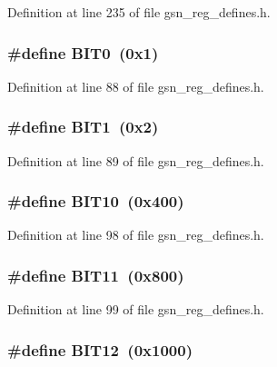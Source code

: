Definition at line 235 of file gsn\_\-reg\_\-defines.h.

\hypertarget{a00546_ad4d43f8748b542bce39e18790f845ecc}{
\subsubsection[{BIT0}]{\setlength{\rightskip}{0pt plus 5cm}\#define BIT0~(0x1)}}
\label{a00546_ad4d43f8748b542bce39e18790f845ecc}


Definition at line 88 of file gsn\_\-reg\_\-defines.h.

\hypertarget{a00546_a601923eba46784638244c1ebf2622a2a}{
\subsubsection[{BIT1}]{\setlength{\rightskip}{0pt plus 5cm}\#define BIT1~(0x2)}}
\label{a00546_a601923eba46784638244c1ebf2622a2a}


Definition at line 89 of file gsn\_\-reg\_\-defines.h.

\hypertarget{a00546_a8c0f01fdf020d0f7467449b181fe95cb}{
\subsubsection[{BIT10}]{\setlength{\rightskip}{0pt plus 5cm}\#define BIT10~(0x400)}}
\label{a00546_a8c0f01fdf020d0f7467449b181fe95cb}


Definition at line 98 of file gsn\_\-reg\_\-defines.h.

\hypertarget{a00546_a2cda1debde057b596766eba6a76daca0}{
\subsubsection[{BIT11}]{\setlength{\rightskip}{0pt plus 5cm}\#define BIT11~(0x800)}}
\label{a00546_a2cda1debde057b596766eba6a76daca0}


Definition at line 99 of file gsn\_\-reg\_\-defines.h.

\hypertarget{a00546_aaa0a6acba8436baabcaa1e91fad6c0bd}{
\subsubsection[{BIT12}]{\setlength{\rightskip}{0pt plus 5cm}\#define BIT12~(0x1000)}}
\label{a00546_aaa0a6acba8436baabcaa1e91fad6c0bd}


